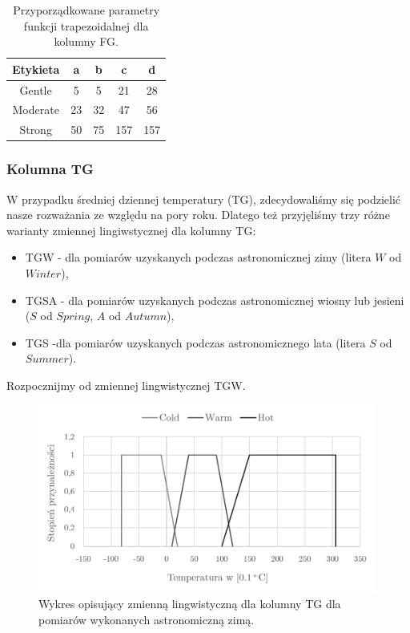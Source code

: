 \documentclass{classrep}
\begin{document}
\begin{table}[H]
	\centering
	\begin{tabular}{c c c c c} 
		\hline
		\textbf{Etykieta} & \textbf{a} & \textbf{b} & \textbf{c} & \textbf{d}\\ [0.5ex] 
		\hline
		\hline 
Gentle	 & 5 & 5 & 21 & 28 \\
Moderate & 23 & 32 & 47 & 56 \\
Strong	 & 50 & 75 & 157 & 157 \\
		\hline
	\end{tabular}
	\caption{Przyporządkowane parametry funkcji trapezoidalnej dla kolumny FG.}
\end{table}



\subsubsection{Kolumna TG}
W przypadku średniej dziennej temperatury (TG), zdecydowaliśmy się podzielić nasze rozważania ze względu na pory roku. Dlatego też przyjęliśmy trzy różne warianty zmiennej lingiwstycznej dla kolumny TG:

\begin{itemize}[label=$\bullet$\scshape\bfseries]
\item TGW - dla pomiarów uzyskanych podczas astronomicznej zimy (litera $W$ od $Winter$),
\item TGSA - dla pomiarów uzyskanych podczas astronomicznej wiosny lub jesieni ($S$ od $Spring$, $A$ od $Autumn$),
\item TGS -dla pomiarów uzyskanych podczas astronomicznego lata  (litera $S$ od $Summer$).\newline\newline
\end{itemize}

Rozpocznijmy od zmiennej lingwistycznej TGW.
\begin{figure}[H]
	\centering
	\includegraphics[width=0.99\textwidth]{Pictures/TermsCharts/TG_Z.png}
	\caption{Wykres opisujący zmienną lingwistyczną dla kolumny TG dla pomiarów wykonanych astronomiczną zimą.}
\end{figure}
\end{document}

